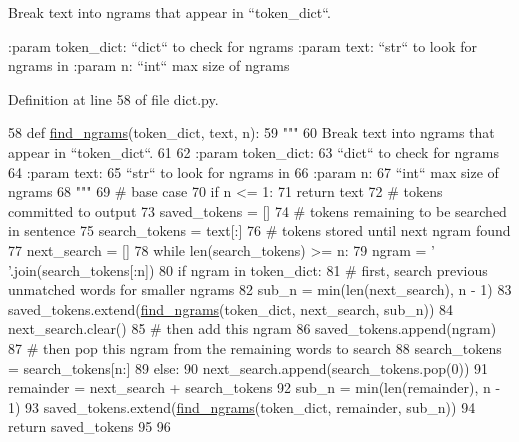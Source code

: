 \begin{DoxyVerb}Break text into ngrams that appear in ``token_dict``.

:param token_dict:
    ``dict`` to check for ngrams
:param text:
    ``str`` to look for ngrams in
:param n:
    ``int`` max size of ngrams
\end{DoxyVerb}
 

Definition at line 58 of file dict.\+py.


\begin{DoxyCode}
58 \textcolor{keyword}{def }\hyperlink{namespaceparlai_1_1core_1_1dict_a5e9eb43b6c0dce0b3aab7f3ea3717de6}{find\_ngrams}(token\_dict, text, n):
59     \textcolor{stringliteral}{"""}
60 \textcolor{stringliteral}{    Break text into ngrams that appear in ``token\_dict``.}
61 \textcolor{stringliteral}{}
62 \textcolor{stringliteral}{    :param token\_dict:}
63 \textcolor{stringliteral}{        ``dict`` to check for ngrams}
64 \textcolor{stringliteral}{    :param text:}
65 \textcolor{stringliteral}{        ``str`` to look for ngrams in}
66 \textcolor{stringliteral}{    :param n:}
67 \textcolor{stringliteral}{        ``int`` max size of ngrams}
68 \textcolor{stringliteral}{    """}
69     \textcolor{comment}{# base case}
70     \textcolor{keywordflow}{if} n <= 1:
71         \textcolor{keywordflow}{return} text
72     \textcolor{comment}{# tokens committed to output}
73     saved\_tokens = []
74     \textcolor{comment}{# tokens remaining to be searched in sentence}
75     search\_tokens = text[:]
76     \textcolor{comment}{# tokens stored until next ngram found}
77     next\_search = []
78     \textcolor{keywordflow}{while} len(search\_tokens) >= n:
79         ngram = \textcolor{stringliteral}{' '}.join(search\_tokens[:n])
80         \textcolor{keywordflow}{if} ngram \textcolor{keywordflow}{in} token\_dict:
81             \textcolor{comment}{# first, search previous unmatched words for smaller ngrams}
82             sub\_n = min(len(next\_search), n - 1)
83             saved\_tokens.extend(\hyperlink{namespaceparlai_1_1core_1_1dict_a5e9eb43b6c0dce0b3aab7f3ea3717de6}{find\_ngrams}(token\_dict, next\_search, sub\_n))
84             next\_search.clear()
85             \textcolor{comment}{# then add this ngram}
86             saved\_tokens.append(ngram)
87             \textcolor{comment}{# then pop this ngram from the remaining words to search}
88             search\_tokens = search\_tokens[n:]
89         \textcolor{keywordflow}{else}:
90             next\_search.append(search\_tokens.pop(0))
91     remainder = next\_search + search\_tokens
92     sub\_n = min(len(remainder), n - 1)
93     saved\_tokens.extend(\hyperlink{namespaceparlai_1_1core_1_1dict_a5e9eb43b6c0dce0b3aab7f3ea3717de6}{find\_ngrams}(token\_dict, remainder, sub\_n))
94     \textcolor{keywordflow}{return} saved\_tokens
95 
96 
\end{DoxyCode}
\mbox{\label{namespaceparlai_1_1core_1_1dict_a4d8952ff127b540967c707a58e8ebb48}} 
